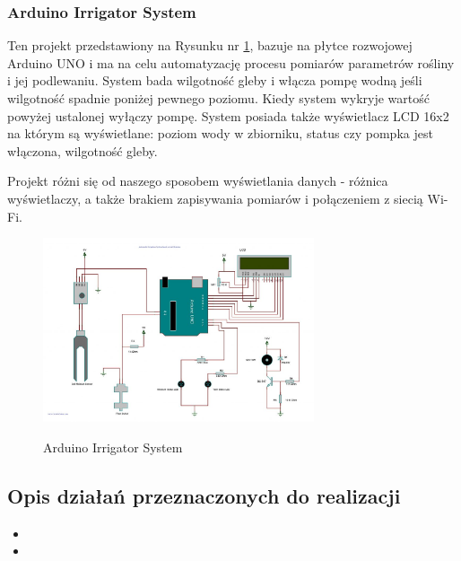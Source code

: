 \documentclass[12pt]{article}
\begin{document}
\newpage
\subsubsection{Arduino Irrigator System }

Ten projekt przedstawiony na Rysunku nr \ref{fig:ArduinoIS}, bazuje na płytce rozwojowej Arduino UNO i ma na celu automatyzację procesu pomiarów parametrów rośliny i jej podlewaniu. System bada wilgotność gleby i włącza pompę wodną jeśli wilgotność spadnie poniżej pewnego poziomu. Kiedy system wykryje wartość powyżej ustalonej wyłączy pompę. System posiada także wyświetlacz LCD 16x2 na którym są wyświetlane: poziom wody w zbiorniku, status czy pompka jest włączona, wilgotność gleby.

Projekt różni się od naszego sposobem wyświetlania danych - różnica wyświetlaczy, a także brakiem zapisywania pomiarów i połączeniem z siecią Wi-Fi.



\begin{figure}[!h]
	\begin{center}
		{\includegraphics[width=8cm]{arduino_przyklad2.jpg}}
	\end{center}
	\caption{Arduino Irrigator System ~\cite{ArduinoIS}}
	\label{fig:ArduinoIS}
\end{figure}




\subsection{Opis działań przeznaczonych do realizacji }

\begin{itemize}
	\item 
	
	\item 
	

\end{itemize}
\end{document}
